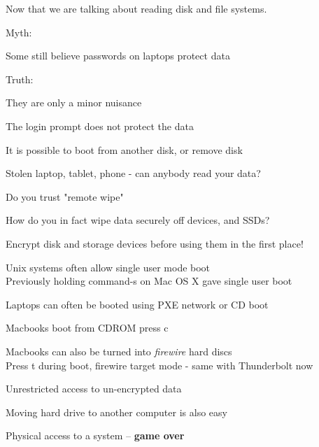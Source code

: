 \documentclass[Screen16to9,17pt]{foils}
\begin{document}

Now that we are talking about reading disk and file systems.

\begin{list1}
\item Myth:
\item Some still believe passwords on laptops protect data
\item Truth:
\item They are only a minor nuisance
\item The login prompt does not protect the data
\item It is possible to boot from another disk, or remove disk
\end{list1}




\begin{list1}
\item Stolen laptop, tablet, phone - can anybody read your data?
\item Do you trust "remote wipe"
\item How do you in fact wipe data securely off devices, and SSDs?
\item Encrypt disk and storage devices before using them in the first place!
\end{list1}


\begin{list1}
\item Unix systems often allow single user mode boot\\
Previously holding command-s on Mac OS X gave single user boot
\item Laptops can often be booted using PXE network or CD boot
\item Macbooks boot from CDROM press c
\item Macbooks can also be turned into \emph{firewire} hard discs\\
Press t during boot, firewire target mode - same with Thunderbolt now
\item Unrestricted access to un-encrypted data
\item Moving hard drive to another computer is also easy
\end{list1}
\pause
\centerline{Physical access to a system -- {\bf game over}}

\end{document}
